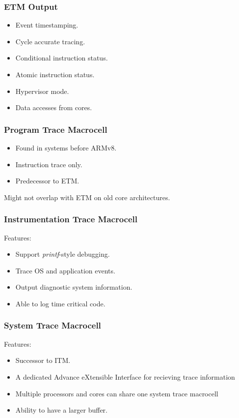 \documentclass{beamer}
\begin{document}
\begin{frame}
    \frametitle{ETM Output}
    \begin{itemize}
        \item Event timestamping.
        \item Cycle accurate tracing.
        \item Conditional instruction status.
        \item Atomic instruction status.
        \item Hypervisor mode.
        \item Data accesses from cores.
    \end{itemize}
\end{frame}

\begin{frame}
    \frametitle{Program Trace Macrocell}
    \begin{itemize}
        \item Found in systems before ARMv8.
        \item Instruction trace only.
        \item Predecessor to ETM.
    \end{itemize}
    Might not overlap with ETM on old core architectures.
\end{frame}

\begin{frame}
    \frametitle{Instrumentation Trace Macrocell}
    Features:
    \begin{itemize}
        \item Support \textit{printf}-style debugging.
        \item Trace OS and application events.
        \item Output diagnostic system information.
        \item Able to log time critical code.
    \end{itemize}
\end{frame}

\begin{frame}
    \frametitle{System Trace Macrocell}
    Features:
    \begin{itemize}
        \item Successor to ITM.
        \item A dedicated Advance eXtensible Interface for recieving trace
            information
        \item Multiple processors and cores can share one system trace
            macrocell
        \item Ability to have a larger buffer.
    \end{itemize}
\end{frame}
\end{document}
